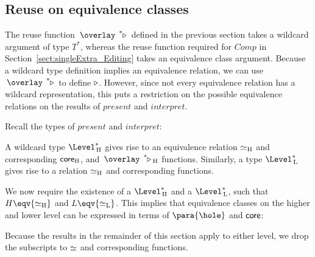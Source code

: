\subsection{Reuse on equivalence classes}

The reuse function $\reuzestar$ defined in the previous section takes a wildcard argument of type $T^*$, whereas the reuse function required for $Comp$ in Section~\ref{sect:singleExtra_Editing} takes an equivalence class argument. Because a wildcard type definition implies an equivalence relation, we can use $\reuzestar$ to define $\triangleright$. However, since not every equivalence relation has a wildcard representation, this puts a restriction on the possible equivalence relations on the results of $present$ and $interpret$.

Recall the types of $present$ and $interpret$:



A wildcard type $\Level^*\H$ gives rise to an equivalence relation $\simeq_{\rm H}$ and corresponding ${\mathsf {core}}_{\rm H}$, and $\reuzestar_{\rm H}$ functions. Similarly, a type $\Level^*\L$ gives rise to a relation $\simeq_{\rm H}$ and corresponding functions. 

We now require the existence of a $\Level^*\H$ and a $\Level^*\L$, such that $H \eqv {\eqstar_{\rm H}}$ and
$L \eqv {\eqstar_{\rm L}}$. This implies that equivalence classes on the higher and lower level can be expressed in terms of $\para{\hole}$ and ${\mathsf {core}}$:


Because the results in the remainder of this section apply to either level, we drop the subscripts to $\simeq$ and corresponding functions.



